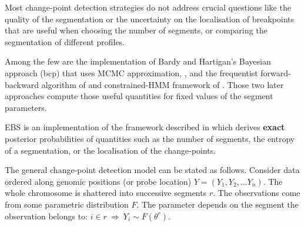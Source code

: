 \documentclass{bioinfo}
\begin{document}
 Most change-point detection strategies do not address crucial questions like the quality of the segmentation or the uncertainty on the localisation of breakpoints that are useful when choosing the number of segments, or comparing the segmentation of different profiles. 

Among the few are the implementation of Bardy and Hartigan's Bayesian approach (bcp) that uses MCMC approximation, \citep{barry_hartigan, bcp_package}, and the frequentist forward-backward algorithm of \cite{guedon_2008} and constrained-HMM framework of  \cite{Luong_HMM_2012}. Those two later approaches compute those useful quantities for fixed values of the segment parameters.

EBS is an implementation of the framework described in \cite{rigaill_exact_2011} which derives \textbf{exact} posterior probabilities of quantities such as the number of segments, the entropy of a segmentation, or the localisation of the change-points.

The general change-point detection model can be stated as
  follows. Consider data ordered along genomic positions (or probe
  location) $Y = (Y_1, Y_2, \dots Y_n)$. The whole chromosome is
  shattered into successive segments $r$. The observations come from
  some parametric distribution $F$. The parameter depends on the
  segment the observation belongs to: $i \in r \: \Rightarrow \: Y_i
  \sim F(\theta^r)$.
\end{document}
